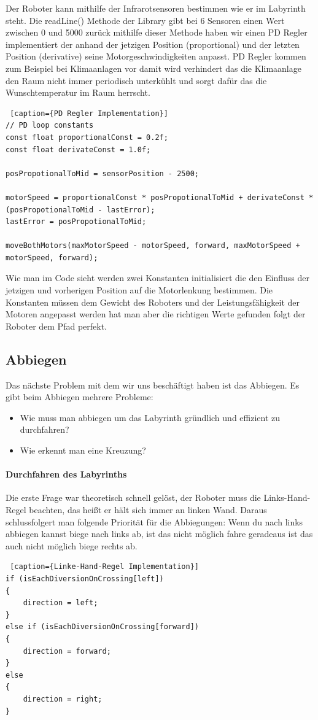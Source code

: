 \documentclass[12pt]{article}
\begin{document}
Der Roboter kann mithilfe der Infrarotsensoren bestimmen wie er im Labyrinth steht. Die readLine() Methode der Library gibt bei 6 Sensoren einen Wert zwischen 0 und 5000 zurück mithilfe dieser Methode haben wir einen PD  Regler implementiert der anhand der jetzigen Position (proportional) und der letzten Position (derivative) seine Motorgeschwindigkeiten anpasst. PD Regler kommen zum Beispiel bei Klimaanlagen vor damit wird verhindert das die Klimaanlage den Raum nicht immer periodisch unterkühlt und sorgt dafür das die Wunschtemperatur im Raum herrscht.
\begin{lstlisting} [caption={PD Regler Implementation}] 
// PD loop constants
const float proportionalConst = 0.2f;
const float derivateConst = 1.0f;

posPropotionalToMid = sensorPosition - 2500;

motorSpeed = proportionalConst * posPropotionalToMid + derivateConst * (posPropotionalToMid - lastError);
lastError = posPropotionalToMid;

moveBothMotors(maxMotorSpeed - motorSpeed, forward, maxMotorSpeed + motorSpeed, forward);
\end{lstlisting}
Wie man im Code sieht werden zwei Konstanten initialisiert die den Einfluss der jetzigen und vorherigen Position auf die Motorlenkung bestimmen. Die Konstanten müssen dem Gewicht des Roboters und der Leistungsfähigkeit der Motoren angepasst werden hat man aber die richtigen Werte gefunden folgt der Roboter dem Pfad perfekt.

\subsection{Abbiegen} Das nächste Problem mit dem wir uns beschäftigt haben ist das Abbiegen. Es gibt beim Abbiegen mehrere Probleme:
\begin{itemize}
\item Wie muss man abbiegen um das Labyrinth gründlich und effizient zu durchfahren?
\item Wie erkennt man eine Kreuzung?
\end{itemize}
\paragraph{Durchfahren des Labyrinths} Die erste Frage war theoretisch schnell gelöst, der Roboter muss die Links-Hand-Regel beachten, das heißt  er hält sich immer an linken Wand. Daraus schlussfolgert man folgende Priorität für die Abbiegungen: Wenn du nach links abbiegen kannst biege nach links ab, ist das nicht möglich fahre geradeaus ist das auch nicht möglich biege rechts ab.
\begin{lstlisting} [caption={Linke-Hand-Regel Implementation}]
if (isEachDiversionOnCrossing[left])
{
    direction = left;
}
else if (isEachDiversionOnCrossing[forward])
{
    direction = forward;
}
else
{
    direction = right;
}
\end{lstlisting}
\end{document}
